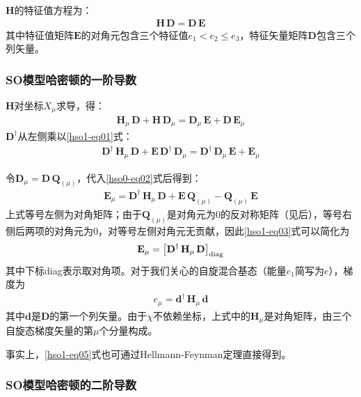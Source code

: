 \documentclass[UTF8]{ctexart}
\begin{document}
$\mathbf{H}$的特征值方程为：
\begin{align}\label{hso0-eq03}
\mathbf{H} \, \mathbf{D} = \mathbf{D} \, \mathbf{E}
\end{align}
其中特征值矩阵$\mathbf{E}$的对角元包含三个特征值$e_1 < e_2 \leq e_3$，特征矢量矩阵$\mathbf{D}$包含三个列矢量。

\subsubsection{SO模型哈密顿的一阶导数}

$\mathbf{H}$对坐标$X_\mu$求导，得：
\begin{align}\label{hso1-eq01}
\mathbf{H}_\mu \, \mathbf{D} + \mathbf{H} \, \mathbf{D}_\mu = \mathbf{D}_\mu \, \mathbf{E} +  \mathbf{D} \, \mathbf{E}_\mu
\end{align}
$\mathbf{D}^\dagger$从左侧乘以\eqref{hso1-eq01}式：
\begin{align}\label{hso1-eq02}
\mathbf{D}^\dagger \, \mathbf{H}_\mu \, \mathbf{D} + \mathbf{E} \, \mathbf{D}^\dagger \, \mathbf{D}_\mu = \mathbf{D}^\dagger \, \mathbf{D}_\mu \, \mathbf{E} +  \mathbf{E}_\mu
\end{align}

令$\mathbf{D}_\mu = \mathbf{D} \, \mathbf{Q}_{(\mu)}$，代入\eqref{hso0-eq02}式后得到：
\begin{align}\label{hso1-eq03}
\mathbf{E}_\mu = \mathbf{D}^\dagger \, \mathbf{H}_\mu \, \mathbf{D} + \mathbf{E} \, \mathbf{Q}_{(\mu)} - \mathbf{Q}_{(\mu)} \, \mathbf{E}
\end{align}
上式等号左侧为对角矩阵；由于$\mathbf{Q}_{(\mu)}$是对角元为0的反对称矩阵（见后），等号右侧后两项的对角元为0，对等号左侧对角元无贡献，因此\eqref{hso1-eq03}式可以简化为
\begin{align}\label{hso1-eq04}
\mathbf{E}_\mu = \left[\mathbf{D}^\dagger \, \mathbf{H}_\mu \, \mathbf{D}\right]_{\rm diag}
\end{align}
其中下标diag表示取对角项。对于我们关心的自旋混合基态（能量$e_1$简写为$e$），梯度为
\begin{align}\label{hso1-eq05}
e_\mu = \mathbf{d}^\dagger \, \mathbf{H}_\mu \, \mathbf{d}
\end{align}
其中$\mathbf{d}$是$\mathbf{D}$的第一个列矢量。由于$\chi$不依赖坐标，上式中的$\mathbf{H}_\mu$是对角矩阵，由三个自旋态梯度矢量的第$\mu$个分量构成。

事实上，\eqref{hso1-eq05}式也可通过Hellmann-Feynman定理直接得到。

\subsubsection{SO模型哈密顿的二阶导数}
\end{document}
